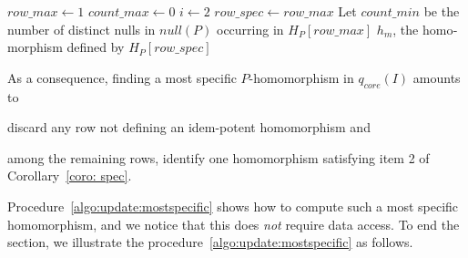 \begin{otherlanguage}{english}
\begin{procedure}[htb]
    $row\_max \gets 1$ \; $count\_max \gets 0$ \; $i \gets 2$\;
    $row\_spec \gets row\_max$\label{assign:row-spec1}\;
    Let $count\_min$ be the number of distinct nulls in $null(P)$ occurring in $H_P[row\_max]$\label{assing:row-min}\;
    \Return $h_m$, the homomorphism defined by $H_P[row\_spec]$ \;
\end{procedure}

As a consequence, finding a most specific $P$-homomorphism in $q_{core}(I)$ amounts to
\begin{enumerate*}[label=(\roman*)]
    \item discard any row not defining an idem-potent homomorphism and
    \item among the remaining rows, identify one homomorphism satisfying item 2 of Corollary~\ref{coro: spec}.
\end{enumerate*}
Procedure~\ref{algo:update:mostspecific} shows how to compute such a most specific homomorphism, and we notice that this does \emph{not} require data access.
To end the section, we illustrate the procedure~\ref{algo:update:mostspecific} as follows.


\end{otherlanguage}

